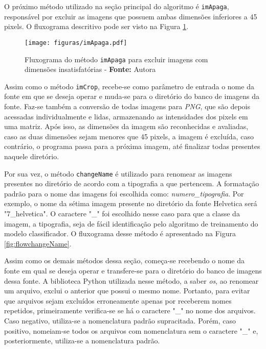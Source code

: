 O próximo método utilizado na seção principal do algoritmo é \texttt{imApaga}, responsável por excluir as imagens que possuem ambas dimensões inferiores a 45 pixels. O fluxograma descritivo pode ser visto na Figura \ref{fig:flowimApaga}.


\begin{figure}[H]
  \centering
  \texttt{[image: figuras/imApaga.pdf]}
  \caption{Fluxograma do método \texttt{imApaga} para excluir imagens com dimensões insatisfatórias - \textbf{Fonte:} Autora}
  \label{fig:flowimApaga}
\end{figure}

Assim como o método \texttt{imCrop}, recebe-se como parâmetro de entrada o nome da fonte em que se deseja operar e muda-se para o diretório do banco de imagens da fonte. Faz-se também a conversão de todas imagens para \textit{PNG}, que são depois acessadas individualmente e lidas, armazenando as intensidades dos pixels em uma matriz. Após isso, as dimensões da imagem são reconhecidas e avaliadas, caso as duas dimensões sejam menores que 45 pixels, a imagem é excluída, caso contrário, o programa passa para a próxima imagem, até finalizar todas presentes naquele diretório.

Por sua vez, o método \texttt{changeName} é utilizado para renomear as imagens presentes no diretório de acordo com a tipografia a que pertencem. A formatação padrão para o nome das imagens foi escolhida como: \textit{numero\_tipografia}. Por exemplo, o nome da sétima imagem presente no diretório da fonte Helvetica será "7\_helvetica". O caractere "\_" {} foi escolhido nesse caso para que a classe da imagem, a tipografia, seja de fácil identificação pelo algoritmo de treinamento do modelo classificador. O fluxograma desse método é apresentado na Figura \ref{fig:flowchangeName}.

Assim como os demais métodos dessa seção, começa-se recebendo o nome da fonte em qual se deseja operar e transfere-se para o diretório do banco de imagens dessa fonte. A biblioteca Python utilizada nesse método, a saber \textit{os}, ao renomear um arquivo, exclui o anterior que possui o mesmo nome. Portanto, para evitar que arquivos sejam excluídos erroneamente apenas por receberem nomes repetidos, primeiramente verifica-se se há o caractere "\_" {} no nome dos arquivos. Caso negativo, utiliza-se a nomenclatura padrão supracitada. Porém, caso positivo, nomeiam-se todos os arquivos com nomenclatura sem o caractere "\_" {} e, posteriormente, utiliza-se a nomenclatura padrão.

